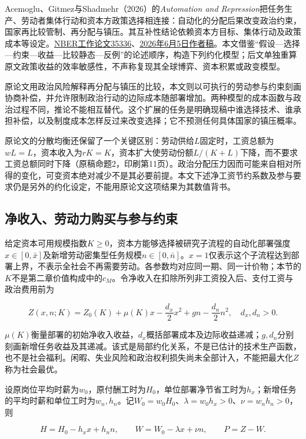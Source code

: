 \documentclass[UTF8,fontset=windows,12pt,a4paper,oneside,openany]{ctexbook}
\begin{document}
Acemoglu、Gitmez与Shadmehr（2026）的\emph{Automation and Repression}把任务生产、劳动者集体行动和资本方政策选择相连接：自动化的分配后果改变政治约束，国家再比较管制、再分配与镇压。其互补性结论依赖资本方目标、集体行动及政策成本等设定。\href{https://doi.org/10.3386/w35336}{NBER工作论文35336}、\href{https://economics.mit.edu/sites/default/files/2026-06/Automation\%20and\%20Repression.pdf}{2026年6月5日作者稿}。本文借鉴“假设—选择—约束—收益—比较静态—反例”的论述顺序，构造下列约化模型；后文单独重算原文政策收益的效率敏感性，不声称复现其全球博弈、资本积累或政变模型。

原论文用政治风险解释再分配与镇压的比较，本文则以可执行的劳动参与约束刻画协商补偿，并允许限制政治行动的边际成本随部署增加。两种模型的成本函数与政治过程不同，推论不能相互替代。这个扩展的任务是明确现稿中谁选择技术、谁承担补偿，以及制度成本怎样反过来改变选择；它不预测任何具体国家的镇压概率。

原论文的分散均衡还保留了一个关键区别：劳动供给$L$固定时，工资总额为$wL=L$，资本收入为$rK=K$，资本扩大使劳动份额$L/(K+L)$下降，而不要求工资总额同时下降（原稿命题2，印刷第11页）。政治分配压力因而可能来自相对所得的变化，可变资本绝对减少不是其必要前提。本文下述净工资节约系数及参与要求仍是另外的约化设定，不能用原论文这项结果为其数值背书。

\subsection{净收入、劳动力购买与参与约束}

给定资本可用规模指数$K\geq0$，资本方能够选择被研究子流程的自动化部署强度$x\in[0,\bar x]$及新增劳动密集型任务规模$n\in[0,\bar n]$。$x=1$仅表示这个子流程达到部署上界，不表示全社会不再需要劳动。各参数均对应同一期、同一计价物；本节的$K$不是第二章价值构成中的$c_M$。令净收入在扣除所列非工资投入后、支付工资与政治费用前为

\[
Z(x,n;K)=Z_0(K)+\mu(K)x-\frac{d_x}{2}x^2
                 +gn-\frac{d_n}{2}n^2,
\quad d_x,d_n>0.
\tag{14-P1}
\]

$\mu(K)$衡量部署的初始净收入收益，$d_x$概括部署成本及边际收益递减；$g,d_n$分别刻画新增任务收益及其递减。该式是局部约化关系，不是已估计的技术生产函数，也不是社会福利。闲暇、失业风险和政治权利损失尚未全部计入，不能把最大化$Z$称为社会最优。

设原岗位平均时薪为$w_0$，原付酬工时为$H_0$，单位部署净节省工时为$h_x$；新增任务的平均时薪和单位工时为$w_n,h_n$。记$W_0=w_0H_0$、$\lambda=w_0h_x>0$、$\nu=w_nh_n>0$，则

\[
H=H_0-h_xx+h_nn,\qquad W=W_0-\lambda x+\nu n,
\qquad P=Z-W.
\tag{14-P2}
\]
\end{document}
